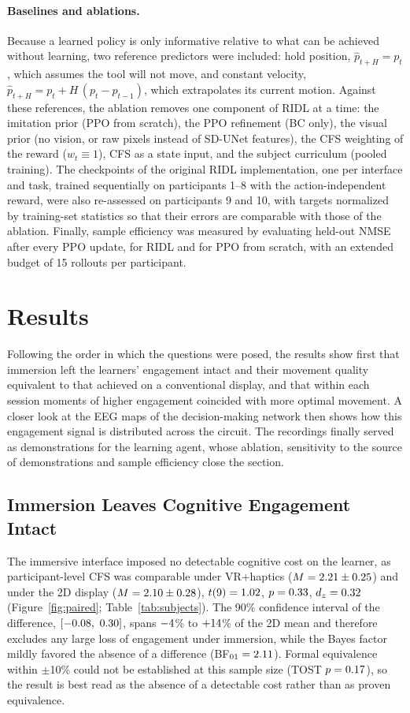 \documentclass[utf8]{frontiers_suppmat}
\begin{document}
\paragraph*{Baselines and ablations.} Because a learned policy is only informative relative to what can be achieved without learning, two reference predictors were included: hold position, $\hat p_{t+H}=p_t$, which assumes the tool will not move, and constant velocity, $\hat p_{t+H}=p_t+H\,(p_t-p_{t-1})$, which extrapolates its current motion. Against these references, the ablation removes one component of RIDL at a time: the imitation prior (PPO from scratch), the PPO refinement (BC only), the visual prior (no vision, or raw pixels instead of SD-UNet features), the CFS weighting of the reward ($w_t\equiv1$), CFS as a state input, and the subject curriculum (pooled training). The checkpoints of the original RIDL implementation, one per interface and task, trained sequentially on participants 1--8 with the action-independent reward, were also re-assessed on participants 9 and 10, with targets normalized by training-set statistics so that their errors are comparable with those of the ablation. Finally, sample efficiency was measured by evaluating held-out NMSE after every PPO update, for RIDL and for PPO from scratch, with an extended budget of 15 rollouts per participant.

\section{Results}
Following the order in which the questions were posed, the results show first that immersion left the learners' engagement intact and their movement quality equivalent to that achieved on a conventional display, and that within each session moments of higher engagement coincided with more optimal movement. A closer look at the EEG maps of the decision-making network then shows how this engagement signal is distributed across the circuit. The recordings finally served as demonstrations for the learning agent, whose ablation, sensitivity to the source of demonstrations and sample efficiency close the section.

\subsection{Immersion Leaves Cognitive Engagement Intact}
The immersive interface imposed no detectable cognitive cost on the learner, as participant-level CFS was comparable under VR+haptics ($M=2.21\pm0.25$) and under the 2D display ($M=2.10\pm0.28$), $t(9)=1.02$, $p=0.33$, $d_z=0.32$ (Figure~\ref{fig:paired}; Table~\ref{tab:subjects}). The 90\% confidence interval of the difference, $[\hCfsCIlo,\ \hCfsCIhi]$, spans $-4$\% to $+14$\% of the 2D mean and therefore excludes any large loss of engagement under immersion, while the Bayes factor mildly favored the absence of a difference (BF$_{01}=2.11$). Formal equivalence within $\pm$10\% could not be established at this sample size (TOST $p=0.17$), so the result is best read as the absence of a detectable cost rather than as proven equivalence.
\end{document}
